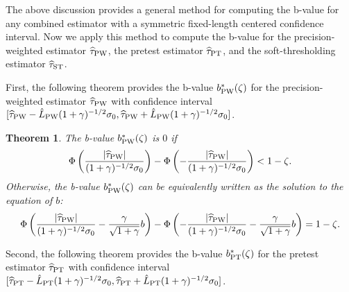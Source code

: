 \documentclass[11pt]{article}
\newcommand{\htau}{\widehat\tau}
\numberwithin{equation}{section}
\newtheorem{theorem}{Theorem}[section]
\theoremstyle{definition}
\begin{document}
The above discussion provides a general method for computing the b-value for any combined estimator with a symmetric fixed-length centered confidence interval. Now we apply this method to compute the b-value for the precision-weighted estimator $\htau_{\rm PW}$, the pretest estimator $\htau_{\rm PT}$, and the soft-thresholding estimator $\htau_{\rm ST}$.

First, the following theorem provides the b-value $b^*_{\rm PW}(\zeta)$ for the precision-weighted estimator $\htau_{\rm PW}$ with confidence interval $[\htau_{\rm PW} - \hat{L}_{\rm PW} (1+\gamma)^{-1/2} \sigma_0, \htau_{\rm PW} + \hat{L}_{\rm PW} (1+\gamma)^{-1/2} \sigma_0]$.

\begin{theorem}\label{thm:b_PW}
  The b-value $b^*_{\rm PW}(\zeta)$ is $0$ if
  \[
    \Phi\left(\frac{\lvert \htau_{\rm PW} \rvert}{(1+\gamma)^{-1/2} \sigma_0}\right) - \Phi\left(-\frac{\lvert \htau_{\rm PW} \rvert}{(1+\gamma)^{-1/2} \sigma_0}\right) < 1-\zeta.
  \]
  Otherwise, the b-value $b^*_{\rm PW}(\zeta)$ can be equivalently written as the solution to the equation of $b$:
  \[
  \Phi\left(\frac{\lvert \htau_{\rm PW} \rvert}{(1+\gamma)^{-1/2} \sigma_0} - \frac{\gamma}{\sqrt{1+\gamma}} b \right) - \Phi\left(-\frac{\lvert \htau_{\rm PW} \rvert}{(1+\gamma)^{-1/2} \sigma_0}  - \frac{\gamma}{\sqrt{1+\gamma}} b \right) = 1-\zeta.
\]
\end{theorem}

Second, the following theorem provides the b-value $b^*_{\rm PT}(\zeta)$ for the pretest estimator $\htau_{\rm PT}$ with confidence interval $[\htau_{\rm PT} - \hat{L}_{\rm PT} (1+\gamma)^{-1/2} \sigma_0, \htau_{\rm PT} + \hat{L}_{\rm PT} (1+\gamma)^{-1/2} \sigma_0]$.
\end{document}
